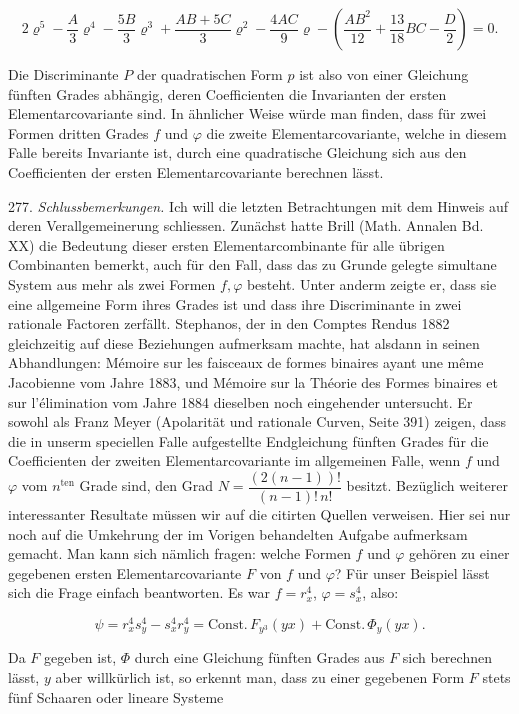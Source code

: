 \documentclass[11pt]{article}
\let\Phi\varPhi
\begin{document}
\[
2\varrho^5 - \frac{A}{3}\varrho^4 - \frac{5B}{3}\varrho^3 + \frac{AB+5C}{3}\varrho^2 - \frac{4AC}{9}\varrho - \left(\frac{AB^2}{12} + \frac{13}{18}BC - \frac{D}{2}\right) = 0.
\]

Die Discriminante $P$ der quadratischen Form $p$ ist also von einer Gleichung fünften Grades abhängig, deren Coefficienten die Invarianten der ersten Elementarcovariante sind. In ähnlicher Weise würde man finden, dass für zwei Formen dritten Grades $f$ und $\varphi$ die zweite Elementarcovariante, welche in diesem Falle bereits Invariante ist, durch eine quadratische Gleichung sich aus den Coefficienten der ersten Elementarcovariante berechnen lässt.

277. \textit{Schlussbemerkungen.} Ich will die letzten Betrachtungen mit dem Hinweis auf deren Verallgemeinerung schliessen. Zunächst hatte Brill (Math. Annalen Bd. XX) die Bedeutung dieser ersten Elementarcombinante für alle übrigen Combinanten bemerkt, auch für den Fall, dass das zu Grunde gelegte simultane System aus mehr als zwei Formen $f, \varphi$ besteht. Unter anderm zeigte er, dass sie eine allgemeine Form ihres Grades ist und dass ihre Discriminante in zwei rationale Factoren zerfällt. Stephanos, der in den Comptes Rendus 1882 gleichzeitig auf diese Beziehungen aufmerksam machte, hat alsdann in seinen Abhandlungen: \glqq Mémoire sur les faisceaux de formes binaires ayant une même Jacobienne\grqq{} vom Jahre 1883, und \glqq Mémoire sur la Théorie des Formes binaires et sur l'élimination\grqq{} vom Jahre 1884 dieselben noch eingehender untersucht. Er sowohl als Franz Meyer (Apolarität und rationale Curven, Seite 391) zeigen, dass die in unserm speciellen Falle aufgestellte Endgleichung fünften Grades für die Coefficienten der zweiten Elementarcovariante im allgemeinen Falle, wenn $f$ und $\varphi$ vom $n^{\text{ten}}$ Grade sind, den Grad $N = \dfrac{(2(n-1))!}{(n-1)!\,n!}$ besitzt. Bezüglich weiterer interessanter Resultate müssen wir auf die citirten Quellen verweisen. Hier sei nur noch auf die Umkehrung der im Vorigen behandelten Aufgabe aufmerksam gemacht. Man kann sich nämlich fragen: welche Formen $f$ und $\varphi$ gehören zu einer gegebenen ersten Elementarcovariante $F$ von $f$ und $\varphi$? Für unser Beispiel lässt sich die Frage einfach beantworten. Es war $f = r_x^4$, $\varphi = s_x^4$, also:

\[
\psi = r_x^4 s_y^4 - s_x^4 r_y^4 = \mathrm{Const.}\, F_{y^3}(yx) + \mathrm{Const.}\, \Phi_y(yx).
\]

Da $F$ gegeben ist, $\Phi$ durch eine Gleichung fünften Grades aus $F$ sich berechnen lässt, $y$ aber willkürlich ist, so erkennt man, dass zu einer gegebenen Form $F$ stets fünf Schaaren oder lineare Systeme
\end{document}
